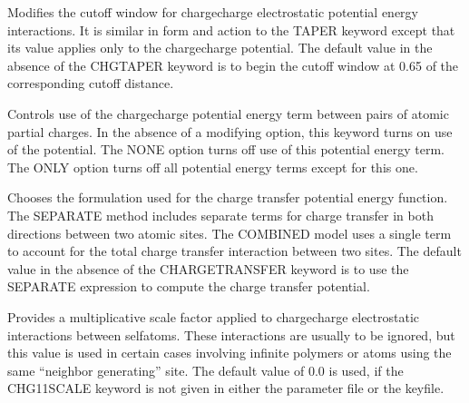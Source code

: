 \documentclass[letterpaper,11pt,english]{sphinxmanual}
\begin{document}
\ignorespaces {}\label{\detokenize{text/keywords:key-charge-taper}}\begin{description}
\sphinxAtStartPar
Modifies the cutoff window for charge\sphinxhyphen{}charge electrostatic potential energy interactions. It is similar in form and action to the TAPER keyword except that its value applies only to the charge\sphinxhyphen{}charge potential. The default value in the absence of the CHG\sphinxhyphen{}TAPER keyword is to begin the cutoff window at 0.65 of the corresponding cutoff distance.

\end{description}

\ignorespaces {}\label{\detokenize{text/keywords:key-chargeterm}}\begin{description}
\sphinxAtStartPar
Controls use of the charge\sphinxhyphen{}charge potential energy term between pairs of atomic partial charges. In the absence of a modifying option, this keyword turns on use of the potential. The NONE option turns off use of this potential energy term. The ONLY option turns off all potential energy terms except for this one.

\end{description}

\ignorespaces {}\label{\detokenize{text/keywords:key-chargetransfer}}\begin{description}
\sphinxAtStartPar
Chooses the formulation used for the charge transfer potential energy function. The SEPARATE method includes separate terms for charge transfer in both directions between two atomic sites. The COMBINED model uses a single term to account for the total charge transfer interaction between two sites. The default value in the absence of the CHARGETRANSFER keyword is to use the SEPARATE expression to compute the charge transfer potential.

\end{description}

\ignorespaces {}\label{\detokenize{text/keywords:key-chg-11-scale}}\begin{description}
\sphinxAtStartPar
Provides a multiplicative scale factor applied to charge\sphinxhyphen{}charge electrostatic interactions between self\sphinxhyphen{}atoms. These interactions are usually to be ignored, but this value is used in certain cases involving infinite polymers or atoms using the same “neighbor generating” site. The default value of 0.0 is used, if the CHG\sphinxhyphen{}11\sphinxhyphen{}SCALE keyword is not given in either the parameter file or the keyfile.

\end{description}
\end{document}
